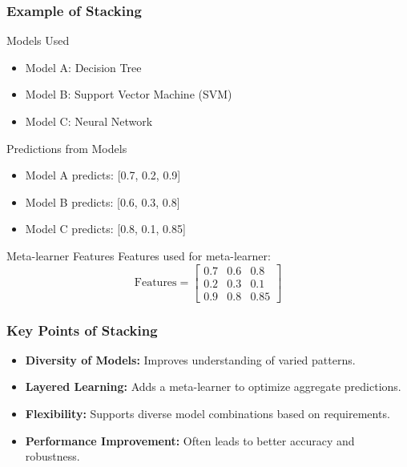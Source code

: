 \documentclass[aspectratio=169]{beamer}
\begin{document}
\begin{frame}[fragile]
    \frametitle{Example of Stacking}
    \begin{block}{Models Used}
        \begin{itemize}
            \item Model A: Decision Tree
            \item Model B: Support Vector Machine (SVM)
            \item Model C: Neural Network
        \end{itemize}
    \end{block}

    \begin{block}{Predictions from Models}
        \begin{itemize}
            \item Model A predicts: [0.7, 0.2, 0.9]
            \item Model B predicts: [0.6, 0.3, 0.8]
            \item Model C predicts: [0.8, 0.1, 0.85]
        \end{itemize}
    \end{block}

    \begin{block}{Meta-learner Features}
        Features used for meta-learner:
        \[
        \text{Features} = 
        \begin{bmatrix}
            0.7 & 0.6 & 0.8 \\
            0.2 & 0.3 & 0.1 \\
            0.9 & 0.8 & 0.85
        \end{bmatrix}
        \]
    \end{block}
\end{frame}

\begin{frame}[fragile]
    \frametitle{Key Points of Stacking}
    \begin{itemize}
        \item \textbf{Diversity of Models:} Improves understanding of varied patterns.
        \item \textbf{Layered Learning:} Adds a meta-learner to optimize aggregate predictions.
        \item \textbf{Flexibility:} Supports diverse model combinations based on requirements.
        \item \textbf{Performance Improvement:} Often leads to better accuracy and robustness.
    \end{itemize}
\end{frame}
\end{document}
